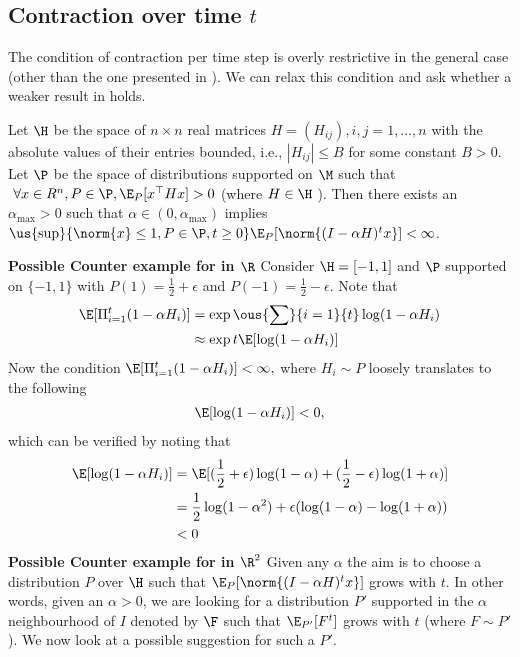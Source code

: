 \subsection{Contraction over time $t$}
The condition of contraction per time step is overly restrictive in the general case (other than the one presented in ). We can relax this condition and ask whether a weaker result in  holds.
\begin{lemma}\label{multheorem}
Let $\H$ be the space of $n\times n$ real matrices $H=(H_{ij}),i,j=1,\ldots,n$ with the absolute values of their entries bounded, i.e., $|H_{ij}|\leq B$ for some constant $B>0$. Let $\P$ be the space of distributions supported on $\M$ such that $~\forall x\in R^n, P\in \P,\E_{P}[x^\top H x] >0$ (where $H\in\H$ ). Then there exists an $\alpha_{\max}>0$ such that $\alpha\in(0,\alpha_{\max})$ implies $\us{\sup}{\norm{x}\leq 1,P\in\P,t\geq 0}\E_{P}[\norm{(I-\alpha H)^tx}]< \infty$.
\end{lemma}
\textbf{Possible Counter example for  in $\R$}
Consider $\H=[-1,1]$ and $\P$ supported on $\{-1,1\}$ with $P(1)=\frac{1}{2}+\epsilon$ and $P(-1)=\frac{1}{2}-\epsilon$. Note that
\begin{align*}
\E[\Pi_{i=1}^t (1-\alpha H_i)]&=\exp{\ous{\sum}{i=1}{t}\log(1-\alpha H_i)}\\
&\approx \exp{t\E[\log(1-\alpha H_i)]}
\end{align*}
Now the condition $\E[\Pi_{i=1}^t (1-\alpha H_i)]<\infty,$ where $H_i\sim P$ loosely translates to the following
\begin{align*}
\E[\log(1-\alpha H_i)]<0,
\end{align*}
which can be verified by noting that
\begin{align*}
\E[\log(1-\alpha H_i)]&=\E[(\frac{1}{2}+\epsilon)\log (1-\alpha)+(\frac{1}{2}-\epsilon)\log (1+\alpha)]\\
&=\frac{1}{2}\log(1-\alpha^2)+\epsilon(\log(1-\alpha)-\log(1+\alpha))\\
&<0
\end{align*}
\textbf{Possible Counter example for  in $\R^2$}
Given any $\alpha$ the aim is to choose a distribution $P$ over $\H$ such that $\E_{P}[\norm{(I-\alpha H)^tx}]$ grows with $t$. In other words, given an $\alpha>0$, we are looking for a distribution $P'$ supported in the $\alpha$ neighbourhood of $I$ denoted by $\F$ such that $\E_{P'}[F^t]$ grows with $t$ (where $F\sim P'$). We now look at a possible suggestion for such a $P'$.\par
